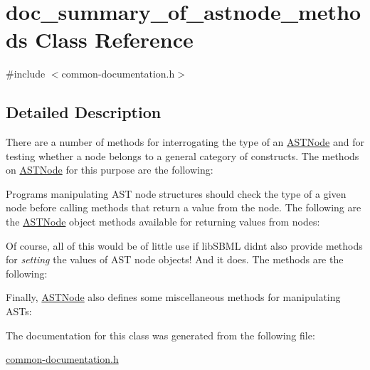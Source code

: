 \hypertarget{classdoc__summary__of__astnode__methods}{}\section{doc\+\_\+summary\+\_\+of\+\_\+astnode\+\_\+methods Class Reference}
\label{classdoc__summary__of__astnode__methods}


{\ttfamily \#include $<$common-\/documentation.\+h$>$}



\subsection{Detailed Description}
\begin{DoxyParagraph}{}
There are a number of methods for interrogating the type of an \hyperlink{class_a_s_t_node}{A\+S\+T\+Node} and for testing whether a node belongs to a general category of constructs. The methods on \hyperlink{class_a_s_t_node}{A\+S\+T\+Node} for this purpose are the following\+:
\end{DoxyParagraph}
Programs manipulating A\+ST node structures should check the type of a given node before calling methods that return a value from the node. The following are the \hyperlink{class_a_s_t_node}{A\+S\+T\+Node} object methods available for returning values from nodes\+:

Of course, all of this would be of little use if lib\+S\+B\+ML didn\textquotesingle{}t also provide methods for {\itshape setting} the values of A\+ST node objects! And it does. The methods are the following\+:

Finally, \hyperlink{class_a_s_t_node}{A\+S\+T\+Node} also defines some miscellaneous methods for manipulating A\+S\+Ts\+: 

The documentation for this class was generated from the following file\+:\begin{DoxyCompactItemize}
\item 
\hyperlink{common-documentation_8h}{common-\/documentation.\+h}\end{DoxyCompactItemize}
